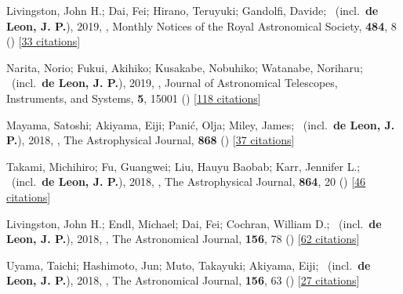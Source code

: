 \item[{\color{numcolor}\scriptsize9}] Livingston, John H.; Dai, Fei; Hirano, Teruyuki; Gandolfi, Davide; \etal\ (incl.\ \textbf{de Leon, J. P.}), 2019, , Monthly Notices of the Royal Astronomical Society, \textbf{484}, 8 () [\href{https://ui.adsabs.harvard.edu/abs/2019MNRAS.484....8L}{33 citations}]

\item[{\color{numcolor}\scriptsize8}] Narita, Norio; Fukui, Akihiko; Kusakabe, Nobuhiko; Watanabe, Noriharu; \etal\ (incl.\ \textbf{de Leon, J. P.}), 2019, , Journal of Astronomical Telescopes, Instruments, and Systems, \textbf{5}, 15001 () [\href{https://ui.adsabs.harvard.edu/abs/2019JATIS...5a5001N}{118 citations}]

\item[{\color{numcolor}\scriptsize7}] Mayama, Satoshi; Akiyama, Eiji; Pani{\'c}, Olja; Miley, James; \etal\ (incl.\ \textbf{de Leon, J. P.}), 2018, , The Astrophysical Journal, \textbf{868} () [\href{https://ui.adsabs.harvard.edu/abs/2018ApJ...868L...3M}{37 citations}]

\item[{\color{numcolor}\scriptsize6}] Takami, Michihiro; Fu, Guangwei; Liu, Hauyu Baobab; Karr, Jennifer L.; \etal\ (incl.\ \textbf{de Leon, J. P.}), 2018, , The Astrophysical Journal, \textbf{864}, 20 () [\href{https://ui.adsabs.harvard.edu/abs/2018ApJ...864...20T}{46 citations}]

\item[{\color{numcolor}\scriptsize5}] Livingston, John H.; Endl, Michael; Dai, Fei; Cochran, William D.; \etal\ (incl.\ \textbf{de Leon, J. P.}), 2018, , The Astronomical Journal, \textbf{156}, 78 () [\href{https://ui.adsabs.harvard.edu/abs/2018AJ....156...78L}{62 citations}]

\item[{\color{numcolor}\scriptsize4}] Uyama, Taichi; Hashimoto, Jun; Muto, Takayuki; Akiyama, Eiji; \etal\ (incl.\ \textbf{de Leon, J. P.}), 2018, , The Astronomical Journal, \textbf{156}, 63 () [\href{https://ui.adsabs.harvard.edu/abs/2018AJ....156...63U}{27 citations}]

